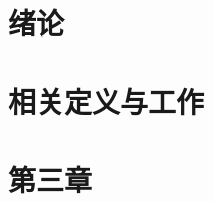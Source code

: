 \documentclass[master]{thesis}
\title{\thesisChineseBookName}{\thesisEnglishBookName}
\theoremstyle{definition} %
\begin{document}
\thesisTitlePage

\begin{chineseAbstract}

\end{chineseAbstract}

\begin{englishAbstract}

\end{englishAbstract}
\let\cleardoublepage\clearpage
\thesisContents
%
\chapter{绪论}
\let\cleardoublepage\clearpage
\label{chapter_introduction}
\renewcommand{\headrulewidth}{0.4pt} %


\chapter{相关定义与工作}


\chapter{第三章}
\end{document}
